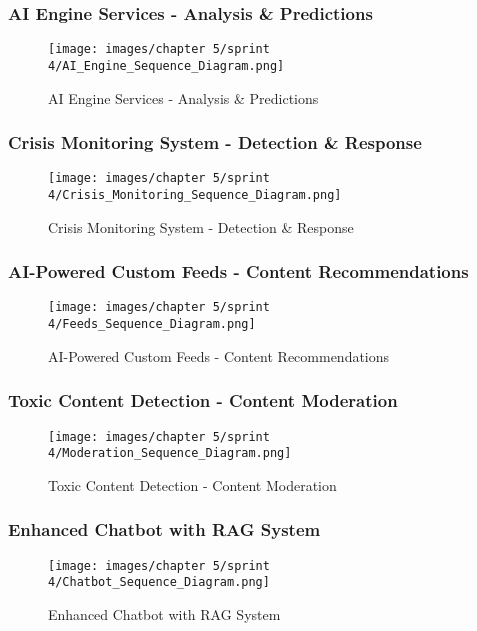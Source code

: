 \subsubsection*{AI Engine Services - Analysis \& Predictions}
\begin{figure}[H]
    \centering
    \texttt{[image: images/chapter 5/sprint 4/AI\_Engine\_Sequence\_Diagram.png]}
    \caption{AI Engine Services - Analysis \& Predictions}
    \label{fig:ai-engine-sequence-diagram}
\end{figure}

\subsubsection*{Crisis Monitoring System - Detection \& Response}
\begin{figure}[H]
    \centering
    \texttt{[image: images/chapter 5/sprint 4/Crisis\_Monitoring\_Sequence\_Diagram.png]}
    \caption{Crisis Monitoring System - Detection \& Response}
    \label{fig:crisis-monitoring-sequence-diagram}
\end{figure}

\subsubsection*{AI-Powered Custom Feeds - Content Recommendations}
\begin{figure}[H]
    \centering
    \texttt{[image: images/chapter 5/sprint 4/Feeds\_Sequence\_Diagram.png]}
    \caption{AI-Powered Custom Feeds - Content Recommendations}
    \label{fig:feeds-sequence-diagram}
\end{figure}

\subsubsection*{Toxic Content Detection - Content Moderation}
\begin{figure}[H]
    \centering
    \texttt{[image: images/chapter 5/sprint 4/Moderation\_Sequence\_Diagram.png]}
    \caption{Toxic Content Detection - Content Moderation}
    \label{fig:moderation-sequence-diagram}
\end{figure}

\subsubsection*{Enhanced Chatbot with RAG System}
\begin{figure}[H]
    \centering
    \texttt{[image: images/chapter 5/sprint 4/Chatbot\_Sequence\_Diagram.png]}
    \caption{Enhanced Chatbot with RAG System}
    \label{fig:chatbot-sequence-diagram}
\end{figure}

